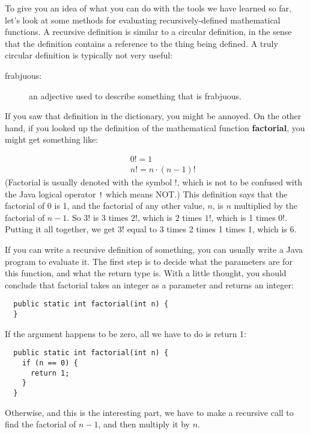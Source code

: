 \documentclass{book}
\begin{document}
To give you an idea of what you can do with the tools we have learned
so far, let's look at some methods for evaluating
recursively-defined mathematical functions.  A recursive definition is
similar to a circular definition, in the sense that the definition
contains a reference to the thing being defined.  A truly circular
definition is typically not very useful:

\begin{description}

\item[frabjuous:] an adjective used to describe
something that is frabjuous.


\end{description}

If you saw that definition in the dictionary, you might be
annoyed.  On the other hand, if you looked up the definition
of the mathematical function {\bf factorial}, you might
get something like:

\begin{eqnarray*}
&&  0! = 1 \\
&&  n! = n \cdot(n-1)!
\end{eqnarray*}
%
(Factorial is usually denoted with the symbol $!$, which is
not to be confused with the Java logical operator {\tt !} which
means NOT.)  This definition says that the factorial of 0 is 1,
and the factorial of any other value, $n$, is $n$ multiplied
by the factorial of $n-1$.  So $3!$ is 3 times $2!$, which is 2 times
$1!$, which is 1 times $0!$.  Putting it all together, we get
$3!$ equal to 3 times 2 times 1 times 1, which is 6.

If you can write a recursive definition of something, you can usually
write a Java program to evaluate it.  The first step is to decide what
the parameters are for this function, and what the return type is.
With a little thought, you should conclude that factorial takes an
integer as a parameter and returns an integer:

\begin{verbatim}
  public static int factorial(int n) {
  }
\end{verbatim}

\noindent If the argument happens to be zero, all we have to do is
return 1:

\begin{verbatim}
  public static int factorial(int n) {
    if (n == 0) {
      return 1;
    }
  }
\end{verbatim}
%
Otherwise, and this is the interesting part, we have to make
a recursive call to find the factorial of $n-1$, and then
multiply it by $n$.
\end{document}
